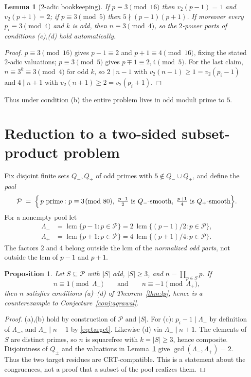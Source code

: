 \documentclass[11pt]{article}
\newtheorem{lemma}[theorem]{Lemma}
\newtheorem{proposition}[theorem]{Proposition}
\theoremstyle{remark}
\newcommand{\cP}{\mathcal{P}}
\DeclareMathOperator{\lcm}{lcm}
\begin{document}
\begin{lemma}[$2$-adic bookkeeping]\label{lem:2adic}
If $p \equiv 3 \pmod{16}$ then $v_2(p-1) = 1$ and $v_2(p+1) = 2$; if
$p \equiv 3 \pmod 5$ then $5 \nmid (p-1)(p+1)$. If moreover every $p_i \equiv 3
\pmod 4$ and $k$ is odd, then $n \equiv 3 \pmod 4$, so the $2$-power parts of
conditions (c),(d) hold automatically.
\end{lemma}
\begin{proof}
$p \equiv 3 \pmod{16}$ gives $p - 1 \equiv 2$ and $p+1 \equiv 4 \pmod{16}$,
fixing the stated $2$-adic valuations; $p \equiv 3 \pmod 5$ gives $p \mp 1
\equiv 2, 4 \pmod 5$. For the last claim, $n \equiv 3^k \equiv 3 \pmod 4$ for
odd $k$, so $2 \mid n-1$ with $v_2(n-1) \ge 1 = v_2(p_i-1)$ and
$4 \mid n+1$ with $v_2(n+1) \ge 2 = v_2(p_i+1)$.
\end{proof}

Thus under condition (b) the entire problem lives in odd moduli prime to $5$.

\section{Reduction to a two-sided subset-product problem}\label{sec:subset}

Fix disjoint finite sets $Q_-, Q_+$ of odd primes with $5 \notin Q_- \cup Q_+$,
and define the \emph{pool}
\[
\cP \;=\; \Bigl\{\, p \ \text{prime} : p \equiv 3 \!\!\pmod{80},\;
\tfrac{p-1}{2} \text{ is } Q_-\text{-smooth},\;
\tfrac{p+1}{4} \text{ is } Q_+\text{-smooth} \Bigr\}.
\]
For a nonempty pool let
\begin{align*}
\Lambda_-&=\lcm\{p-1:p\in\cP\}
          =2\,\lcm\{(p-1)/2:p\in\cP\},\\
\Lambda_+&=\lcm\{p+1:p\in\cP\}
          =4\,\lcm\{(p+1)/4:p\in\cP\}.
\end{align*}
The factors $2$ and $4$ belong outside the lcm of the \emph{normalized odd
parts}, not outside the lcm of $p-1$ and $p+1$.

\begin{proposition}\label{prop:reduction}
Let $S \subseteq \cP$ with $|S|$ odd, $|S| \ge 3$, and $n = \prod_{p \in S} p$.
If
\begin{equation}\label{eq:target}
n \equiv 1 \pmod{\Lambda_-} \qquad\text{and}\qquad n \equiv -1 \pmod{\Lambda_+},
\end{equation}
then $n$ satisfies conditions (a)--(d) of Theorem~\ref{thm:lp}, hence is a
counterexample to Conjecture~\ref{conj:agrawal}.
\end{proposition}
\begin{proof}
(a),(b) hold by construction of $\cP$ and $|S|$. For (c): $p_i - 1 \mid
\Lambda_-$ by definition of $\Lambda_-$, and $\Lambda_- \mid n-1$ by
\eqref{eq:target}. Likewise (d) via $\Lambda_+ \mid n+1$. The elements of $S$
are distinct primes, so $n$ is squarefree with $k = |S| \ge 3$, hence
composite. Disjointness of $Q_\pm$ and the valuations in
Lemma~\ref{lem:2adic} give $\gcd(\Lambda_-,\Lambda_+)=2$.
Thus the two target residues are CRT-compatible. This is a statement about
the congruences, not a proof that a subset of the pool realizes them.
\end{proof}
\end{document}
